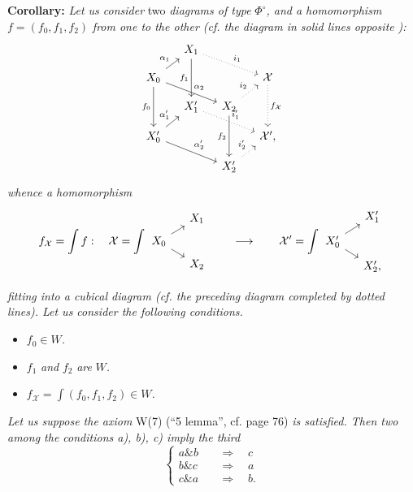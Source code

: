 \documentclass[11pt]{article}
\newcommand{\printedpage}[1]{\marginpar{\footnotesize p.~#1}}
\newcommand{\msp}[1]{\marginpar{\footnotesize [#1]}}
\newcommand{\cX}{\mathcal{X}}
\begin{document}
\textbf{Corollary:} \textit{Let us consider} two \textit{diagrams of type} $\Phi^{\circ}$\textit{, and a homomorphism} $f = (f_0, f_1, f_2)$ \textit{from one to the other (cf. the diagram in solid lines opposite} \textit{):}
\[
\begin{tikzcd}[column sep=small, row sep=small, ampersand replacement=\&]
 \& X_1 \arrow[dd, "f_1"'] \arrow[drr, dotted, "i_1"] \& \& \\
X_0 \arrow[ur, "\alpha_1"] \arrow[drr, "\alpha_2"] \arrow[dd, "f_0"'] \& \& \& \cX \arrow[dd, dotted, "f_{\cX}"] \\
 \& X'_1 \arrow[drr, dotted, "i'_1"] \& X_2 \arrow[ur, dotted, "i_2"] \arrow[dd, "f_2"'] \& \\
X'_0 \arrow[ur, "\alpha'_1"] \arrow[drr, "\alpha'_2"] \& \& \& \cX', \\
 \& \& X'_2 \arrow[ur, dotted, "i'_2"] \&
\end{tikzcd}
\]
\textit{whence a homomorphism}
\msp{page 127}
\[
f_{\cX} = \int f : \quad \cX = \int
\begin{tikzcd}[column sep=small, row sep=tiny, ampersand replacement=\&, baseline=(\tikzcdmatrixname-2-1.base)]
 \& X_1 \\
X_0 \arrow[ur] \arrow[dr] \& \\
 \& X_2
\end{tikzcd}
\qquad\longrightarrow\qquad
\cX' = \int
\begin{tikzcd}[column sep=small, row sep=tiny, ampersand replacement=\&, baseline=(\tikzcdmatrixname-2-1.base)]
 \& X'_1 \\
X'_0 \arrow[ur] \arrow[dr] \& \\
 \& X'_2,
\end{tikzcd}
\]

\printedpage{86}
\textit{fitting into a cubical diagram (cf. the preceding diagram completed by dotted lines). Let us consider the following conditions.}

\begin{itemize}
\item[\textit{a)}] $f_0\in W$\textit{.}
\item[\textit{b)}] $f_1$ \textit{and} $f_2$ \textit{are} $W$\textit{.}
\item[\textit{c)}] $f_{\cX} = \int(f_0, f_1, f_2)\in W$\textit{.}
\end{itemize}

\textit{Let us suppose the axiom} W(7) (``5 lemma'', cf. page 76) \textit{is satisfied. Then two among the conditions a), b), c) imply the third}
\[
\left\{
\begin{aligned}
a \mathbin{\&} b &\quad\Longrightarrow\quad c\\
b \mathbin{\&} c &\quad\Longrightarrow\quad a\\
c \mathbin{\&} a &\quad\Longrightarrow\quad b.
\end{aligned}
\right.
\]
\end{document}
